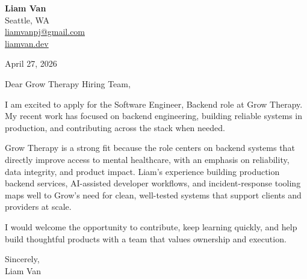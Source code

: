 \documentclass[letterpaper,11pt]{article}
\begin{document}
\begin{flushleft}
\textbf{\Large Liam Van} \\
Seattle, WA \\
\href{mailto:liamvanpj@gmail.com}{liamvanpj@gmail.com} \\
\href{https://liamvan.dev}{liamvan.dev}
\end{flushleft}

April 27, 2026

\noindent Dear Grow Therapy Hiring Team,

\noindent I am excited to apply for the Software Engineer, Backend role at Grow Therapy. My recent work has focused on backend engineering, building reliable systems in production, and contributing across the stack when needed.

\noindent Grow Therapy is a strong fit because the role centers on backend systems that directly improve access to mental healthcare, with an emphasis on reliability, data integrity, and product impact. Liam's experience building production backend services, AI-assisted developer workflows, and incident-response tooling maps well to Grow's need for clean, well-tested systems that support clients and providers at scale.

\noindent I would welcome the opportunity to contribute, keep learning quickly, and help build thoughtful products with a team that values ownership and execution.

\noindent Sincerely, \\
Liam Van
\end{document}
